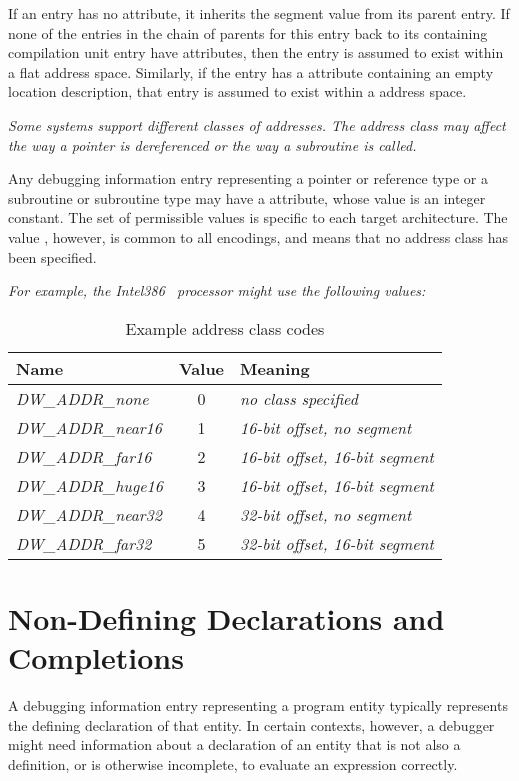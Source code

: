 If an entry has no 
\DWATsegmentNAME{} attribute, it inherits
the segment value from its parent entry.  If none of the
entries in the chain of parents for this entry back to
its containing compilation unit entry have 
\DWATsegmentNAME{} attributes, 
then the entry is assumed to exist within a flat
address space. 
Similarly, if the entry has a 
\DWATsegmentNAME{} attribute 
containing an empty location description, that
entry is assumed to exist within a 
address space.

\textit{Some systems support different 
classes of addresses. 
The address class may affect the way a pointer is dereferenced
or the way a subroutine is called.}


Any debugging information entry representing a pointer or
reference type or a subroutine or subroutine type may 
have a 
\DWATaddressclass{}
attribute, whose value is an integer
constant.  The set of permissible values is specific to
each target architecture. The value \DWADDRnoneTARG, 
however,
is common to all encodings, and means that no address class
has been specified.

\textit {For example, the Intel386 \texttrademark\  processor might use the following values:}

\begin{table}[ht]
\caption{Example address class codes}
\label{tab:inteladdressclasstable}
\centering
\begin{tabular}{l|c|l}
\hline
Name&Value&Meaning  \\
\hline
\textit{DW\_ADDR\_none}&   0 & \textit{no class specified} \\
\textit{DW\_ADDR\_near16}& 1 & \textit{16-bit offset, no segment} \\
\textit{DW\_ADDR\_far16}&  2 & \textit{16-bit offset, 16-bit segment} \\
\textit{DW\_ADDR\_huge16}& 3 & \textit{16-bit offset, 16-bit segment} \\
\textit{DW\_ADDR\_near32}& 4 & \textit{32-bit offset, no segment} \\
\textit{DW\_ADDR\_far32}&  5 & \textit{32-bit offset, 16-bit segment} \\
\hline
\end{tabular}
\end{table}

\section{Non-Defining Declarations and Completions}
\label{chap:nondefiningdeclarationsandcompletions}
A debugging information entry representing a program entity
typically represents the defining declaration of that
entity. In certain contexts, however, a debugger might need
information about a declaration of an entity that is not
also a definition, or is otherwise incomplete, to evaluate
an\hypertarget{chap:DWATdeclarationincompletenondefiningorseparateentitydeclaration}{}
expression correctly.

